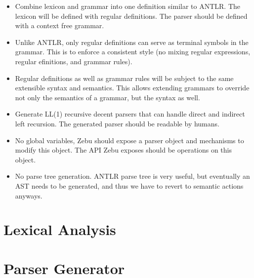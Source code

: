 \documentclass[12pt]{article}
\begin{document}
\begin{itemize}

\item Combine lexicon and grammar into one definition similar to ANTLR. The lexicon will be defined with regular definitions. The parser should be defined with a context free grammar.

\item Unlike ANTLR, only regular definitions can serve as terminal symbols in the grammar. This is to enforce a consistent style (no mixing regular expressions, regular efinitions, and grammar rules).

\item Regular definitions as well as grammar rules will be subject to the same extensible syntax and semantics. This allows extending grammars to override not only the semantics of a grammar, but the syntax as well.

\item Generate LL(1) recursive decent parsers that can handle direct and indirect left recursion. The generated parser should be readable by humans.

\item No global variables, Zebu should expose a parser object and mechanisms to modify this object. The API Zebu exposes should be operations on this object.

\item No parse tree generation. ANTLR parse tree is very useful, but eventually an AST needs to be generated, and thus we have to revert to semantic actions anyways.

\end{itemize}

\section{Lexical Analysis}

\section{Parser Generator}
\end{document}
